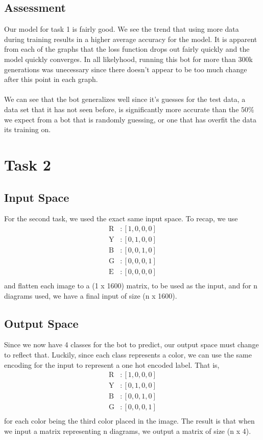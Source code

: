 \documentclass[12pt]{article}
\begin{document}
\subsection*{Assessment}
Our model for task 1 is fairly good. We see the trend that using more data during training results in 
a higher average accuracy for the model. It is apparent from each of the graphs that the loss function 
drops out fairly quickly and the model quickly converges. In all likelyhood, running this bot for more than 
300k generations was unecessary since there doesn't appear to be too much change after this point in each graph. 
\\
\\
We can see that the bot generalizes well since it's guesses for the test data, a data set that it has not 
seen before, is significantly more accurate than the $50 \%$ we expect from a bot that is randomly guessing, 
or one that has overfit the data its training on.  

\section*{Task 2}
\subsection*{Input Space}
For the second task, we used the exact same input space. To recap, we use
\begin{align*}  
    \text{R} &: [1,0,0,0] \\
    \text{Y} &: [0,1,0,0] \\
    \text{B} &: [0,0,1,0] \\
    \text{G} &: [0,0,0,1] \\
    \text{E} &: [0,0,0,0] \\
\end{align*}    
and flatten each image to a (1 x 1600) matrix, to be used as the input, 
and for n diagrams used, we have a final input of size (n x 1600). 

\subsection*{Output Space}
Since we now have 4 classes for the bot to predict, our output space must change to reflect that. Luckily, since 
each class represents a color, we can use the same encoding for the input to represent a one hot encoded label. That is, 
\begin{align*}  
    \text{R} &: [1,0,0,0] \\
    \text{Y} &: [0,1,0,0] \\
    \text{B} &: [0,0,1,0] \\
    \text{G} &: [0,0,0,1] \\
\end{align*}    
for each color being the third color placed in the image. The result is that when we input a matrix representing n diagrams, we 
output a matrix of size (n x 4). 
\end{document}
